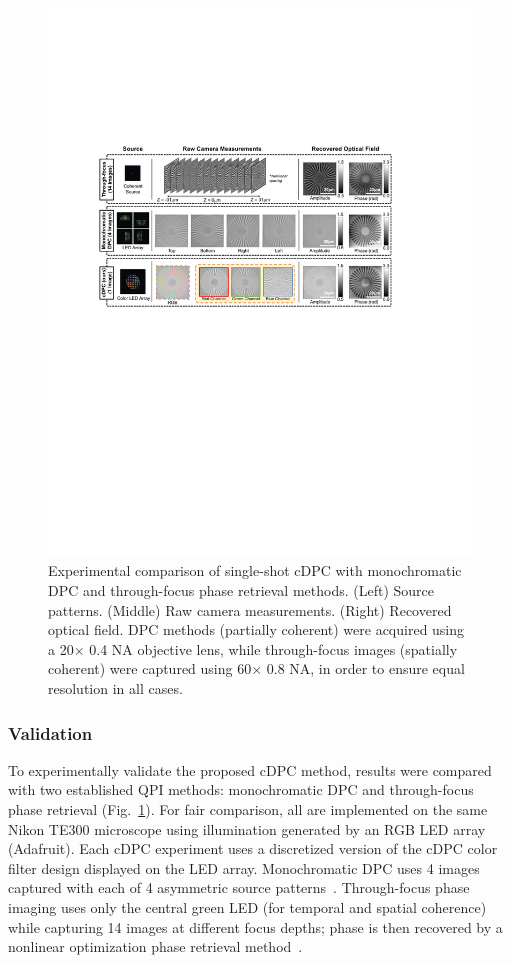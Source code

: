 \begin{figure}[bth]
\centering
\includegraphics[width=\textwidth]{figures/fig_cdpc_comparison.pdf}
\caption{\label{fig:spatialRes}
Experimental comparison of single-shot cDPC with monochromatic DPC and through-focus phase retrieval methods. (Left) Source patterns. (Middle) Raw camera measurements. (Right) Recovered optical field. DPC methods (partially coherent) were acquired using a 20$\times$ 0.4 NA objective lens, while through-focus images (spatially coherent) were captured using 60$\times$ 0.8 NA, in order to ensure equal resolution in all cases.}
\end{figure}

\subsubsection{Validation}

To experimentally validate the proposed cDPC method, results were compared with two established QPI methods: monochromatic DPC and through-focus phase retrieval (Fig.~\ref{fig:spatialRes}). For fair comparison, all are implemented on the same Nikon TE300 microscope using illumination generated by an RGB LED array (Adafruit). Each cDPC experiment uses a discretized version of the cDPC color filter design displayed on the LED array. Monochromatic DPC uses 4 images captured with each of 4 asymmetric source patterns~\cite{zijiMulti}. Through-focus phase imaging uses only the central green LED (for temporal and spatial coherence) while capturing 14 images at different focus depths; phase is then recovered by a nonlinear optimization phase retrieval method~\cite{JingsanSourceRecovery2016}.

